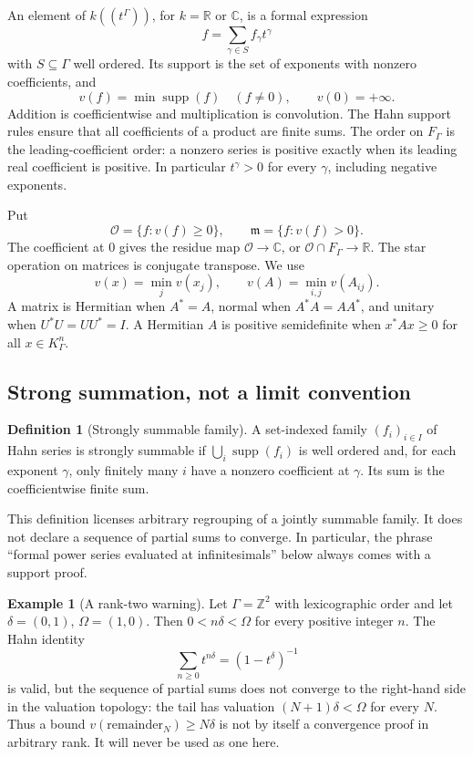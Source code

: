 \documentclass[11pt,letterpaper]{article}
\numberwithin{equation}{section}
\theoremstyle{definition}
\newtheorem{definition}[theorem]{Definition}
\newtheorem{example}[theorem]{Example}
\theoremstyle{remark}
\newcommand{\R}{\mathbb R}
\newcommand{\C}{\mathbb C}
\newcommand{\Z}{\mathbb Z}
\newcommand{\OO}{\mathcal O}
\newcommand{\mm}{\mathfrak m}
\newcommand{\supp}{\operatorname{supp}}
\newcommand{\KG}{K_{\Gamma}}
\newcommand{\FG}{F_{\Gamma}}
\begin{document}
An element of $k((t^\Gamma))$, for $k=\R$ or $\C$, is a formal expression
\[
 f=\sum_{\gamma\in S}f_\gamma t^\gamma
\]
with $S\subseteq\Gamma$ well ordered. Its support is the set of exponents with
nonzero coefficients, and
\[
 v(f)=\min\supp(f)\quad(f\ne0),\qquad v(0)=+\infty.
\]
Addition is coefficientwise and multiplication is convolution. The Hahn
support rules ensure that all coefficients of a product are finite sums.
The order on $\FG$ is the leading-coefficient order: a nonzero series is
positive exactly when its leading real coefficient is positive. In
particular $t^\gamma>0$ for every $\gamma$, including negative exponents.

Put
\[
 \OO=\{f:v(f)\ge0\},\qquad \mm=\{f:v(f)>0\}.
\]
The coefficient at $0$ gives the residue map $\OO\to\C$, or $\OO\cap\FG\to\R$.
The star operation on matrices is conjugate transpose. We use
\[
 v(x)=\min_jv(x_j),\qquad v(A)=\min_{i,j}v(A_{ij}).
\]
A matrix is Hermitian when $A^*=A$, normal when $A^*A=AA^*$, and unitary when
$U^*U=UU^*=I$. A Hermitian $A$ is positive semidefinite when
$x^*Ax\ge0$ for all $x\in\KG^n$.

\subsection{Strong summation, not a limit convention}

\begin{definition}[Strongly summable family]
A set-indexed family $(f_i)_{i\in I}$ of Hahn series is strongly summable if
$\bigcup_i\supp(f_i)$ is well ordered and, for each exponent $\gamma$, only
finitely many $i$ have a nonzero coefficient at $\gamma$. Its sum is the
coefficientwise finite sum.
\end{definition}

This definition licenses arbitrary regrouping of a jointly summable family.
It does not declare a sequence of partial sums to converge. In particular,
the phrase ``formal power series evaluated at infinitesimals'' below always
comes with a support proof.

\begin{example}[A rank-two warning]\label{ex:nonconvergence}
Let $\Gamma=\Z^2$ with lexicographic order and let
$\delta=(0,1)$, $\Omega=(1,0)$. Then $0<n\delta<\Omega$ for every positive
integer $n$. The Hahn identity
\[
 \sum_{n\ge0}t^{n\delta}=(1-t^\delta)^{-1}
\]
is valid, but the sequence of partial sums does not converge to the right-hand
side in the valuation topology: the tail has valuation $(N+1)\delta<\Omega$
for every $N$. Thus a bound $v(\text{remainder}_N)\ge N\delta$ is not by itself
a convergence proof in arbitrary rank. It will never be used as one here.
\end{example}
\end{document}
